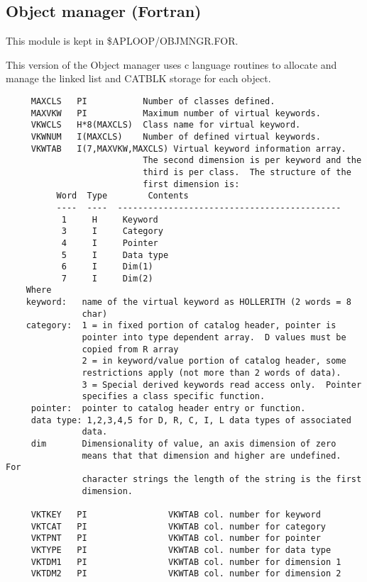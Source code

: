 \subsection{Object manager (Fortran) }

   This module is kept in \$APLOOP/OBJMNGR.FOR.

   This version of the Object manager uses c language routines to
allocate and manage the linked list and CATBLK storage for each
object.

{\small\begin{verbatim}
     MAXCLS   PI           Number of classes defined.
     MAXVKW   PI           Maximum number of virtual keywords.
     VKWCLS   H*8(MAXCLS)  Class name for virtual keyword.
     VKWNUM   I(MAXCLS)    Number of defined virtual keywords.
     VKWTAB   I(7,MAXVKW,MAXCLS) Virtual keyword information array.
                           The second dimension is per keyword and the
                           third is per class.  The structure of the
                           first dimension is:
          Word  Type        Contents
          ----  ----  --------------------------------------------
           1     H     Keyword
           3     I     Category
           4     I     Pointer
           5     I     Data type
           6     I     Dim(1)
           7     I     Dim(2)
    Where
    keyword:   name of the virtual keyword as HOLLERITH (2 words = 8
               char)
    category:  1 = in fixed portion of catalog header, pointer is
               pointer into type dependent array.  D values must be
               copied from R array
               2 = in keyword/value portion of catalog header, some
               restrictions apply (not more than 2 words of data).
               3 = Special derived keywords read access only.  Pointer
               specifies a class specific function.
     pointer:  pointer to catalog header entry or function.
     data type: 1,2,3,4,5 for D, R, C, I, L data types of associated
               data.
     dim       Dimensionality of value, an axis dimension of zero
               means that that dimension and higher are undefined.  For
               character strings the length of the string is the first
               dimension.

     VKTKEY   PI                VKWTAB col. number for keyword
     VKTCAT   PI                VKWTAB col. number for category
     VKTPNT   PI                VKWTAB col. number for pointer
     VKTYPE   PI                VKWTAB col. number for data type
     VKTDM1   PI                VKWTAB col. number for dimension 1
     VKTDM2   PI                VKWTAB col. number for dimension 2


\end{verbatim}}
